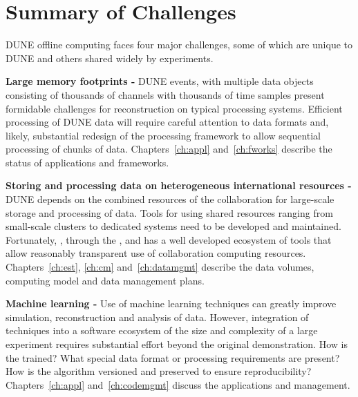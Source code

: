 \documentclass[../main-v1.tex]{subfiles}
\begin{document}
\section{Summary of Challenges }

DUNE offline computing faces four major challenges, some of which are unique to DUNE and others shared widely by  experiments.  

\begin{description}
\item{\bf Large memory footprints -}  DUNE events, with multiple data objects consisting of  thousands of channels with thousands of time samples   present formidable challenges for reconstruction on typical  processing systems. Efficient processing of DUNE data will require careful attention to data formats and, likely, substantial redesign of the processing framework to allow sequential processing of chunks of data.  Chapters~\ref{ch:appl} and~\ref{ch:fworks} describe the status of applications and frameworks. 

\item{\bf Storing and processing data on heterogeneous international  resources -} DUNE depends on the combined resources of the collaboration for large-scale storage and processing of data.   Tools for using shared resources ranging from small-scale clusters to dedicated  systems need to be developed and maintained.   Fortunately, , through the ,  and   has a well developed ecosystem of tools that allow reasonably transparent use of collaboration computing resources.  Chapters~\ref{ch:est}, \ref{ch:cm} and~\ref{ch:datamgmt} describe the data volumes, computing model and data management plans. 

\item{
\bf Machine learning - }  Use of machine learning techniques can greatly improve simulation, reconstruction and analysis of data. However, integration of  techniques into a software ecosystem of the size and complexity of a large  experiment requires substantial effort beyond the original demonstration.  How is the  trained?  What special data format or processing requirements are present? How is the algorithm versioned and preserved to ensure reproducibility?   Chapters~\ref{ch:appl} and~\ref{ch:codemgmt} discuss the applications and management.


\end{description}
\end{document}
